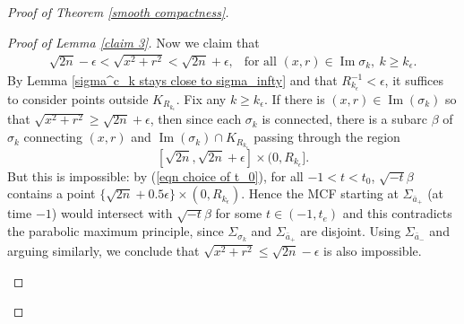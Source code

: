\documentclass[12pt]{amsart}
\numberwithin{equation}{section}
\theoremstyle{remark}
\begin{document}
\begin{proof} [Proof of Theorem \ref{smooth compactness}]
\begin{proof} [Proof of Lemma \ref{claim 3}]
			Now we claim that 
			\begin{align} \label{Hausdorff converges to round sphere eqn}
				\sqrt{2n}-\epsilon<\sqrt{x^2+r^2}<\sqrt{2n}+\epsilon, \ \ \text{ for all }(x,r)\in \operatorname{Im}\sigma_k, \ k\ge k_\epsilon.
			\end{align}
			By Lemma \ref{sigma^c_k stays close to sigma_infty} and that $R_{k_\epsilon}^{-1}<\epsilon$, it suffices to consider points outside $K_{R_{k_\epsilon}}$. Fix any $k\ge k_\epsilon$. If there is $(x,r)\in \operatorname{Im}(\sigma_k)$ so that $\sqrt{x^2+r^2} \ge \sqrt{2n} +\epsilon$, then since each $\sigma_k$ is connected, there is a subarc $\beta$ of $\sigma_k$ connecting $(x,r)$ and $\operatorname{Im} (\sigma_k) \cap K_{R_{k_\epsilon}}$ passing through the region 
			\[ [\sqrt{2n}, \sqrt{2n} +\epsilon] \times (0,R_{k_\epsilon}].\] 
			But this is impossible: by (\ref{eqn choice of t_0}), for all $-1<t<t_0$, $\sqrt{-t}\beta$ contains a point $\{\sqrt{2n} + 0.5\epsilon\} \times (0,R_{k_\epsilon})$. Hence the MCF starting at $\Sigma_{\bar a_+}$ (at time $-1$) would intersect with $\sqrt{-t}\beta$ for some $t\in (-1, t_e)$ and this contradicts the parabolic maximum principle, since $\Sigma_{\sigma_k}$ and $\Sigma_{\bar a_+}$ are disjoint. Using $\Sigma_{\bar a_-}$ and arguing similarly, we conclude that $\sqrt{x^2+r^2}\le \sqrt{2n}-\epsilon$ is also impossible. 
			\begin{figure}[ht]
				
				\begin{tikzpicture}[x=0.75pt,y=0.75pt,yscale=-1,xscale=1]
					

\end{tikzpicture}
\end{figure}
\end{proof}
\end{proof}
\end{document}
